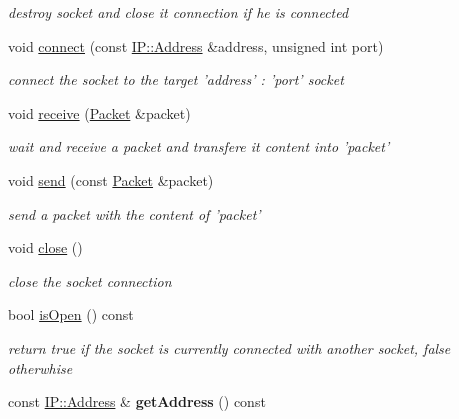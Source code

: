 \begin{DoxyCompactItemize}
\begin{DoxyCompactList}\small\item\em destroy socket and close it connection if he is connected \end{DoxyCompactList}\item 
void \hyperlink{class_f_t_p_1_1_t_c_p_1_1_socket_a220e0105754cdf9378411b24809a4f04}{connect} (const \hyperlink{class_f_t_p_1_1_i_p_1_1_address}{I\-P\-::\-Address} \&address, unsigned int port)
\begin{DoxyCompactList}\small\item\em connect the socket to the target 'address' \-: 'port' socket \end{DoxyCompactList}\item 
void \hyperlink{class_f_t_p_1_1_t_c_p_1_1_socket_a1a06bb837f2a2d82f3477ecf4da373c7}{receive} (\hyperlink{class_f_t_p_1_1_packet}{Packet} \&packet)
\begin{DoxyCompactList}\small\item\em wait and receive a packet and transfere it content into 'packet' \end{DoxyCompactList}\item 
void \hyperlink{class_f_t_p_1_1_t_c_p_1_1_socket_a7ebcedc1c8baba1a838bdb46babea2eb}{send} (const \hyperlink{class_f_t_p_1_1_packet}{Packet} \&packet)
\begin{DoxyCompactList}\small\item\em send a packet with the content of 'packet' \end{DoxyCompactList}\item 
\hypertarget{class_f_t_p_1_1_t_c_p_1_1_socket_a783815d519b4f76ac7f25e946e8be21e}{void \hyperlink{class_f_t_p_1_1_t_c_p_1_1_socket_a783815d519b4f76ac7f25e946e8be21e}{close} ()}\label{class_f_t_p_1_1_t_c_p_1_1_socket_a783815d519b4f76ac7f25e946e8be21e}

\begin{DoxyCompactList}\small\item\em close the socket connection \end{DoxyCompactList}\item 
\hypertarget{class_f_t_p_1_1_t_c_p_1_1_socket_a9323b1947771c55468a303199742a840}{bool \hyperlink{class_f_t_p_1_1_t_c_p_1_1_socket_a9323b1947771c55468a303199742a840}{is\-Open} () const }\label{class_f_t_p_1_1_t_c_p_1_1_socket_a9323b1947771c55468a303199742a840}

\begin{DoxyCompactList}\small\item\em return true if the socket is currently connected with another socket, false otherwhise \end{DoxyCompactList}\item 
\hypertarget{class_f_t_p_1_1_t_c_p_1_1_socket_a79f3892a2088f566286baf5e4e89f939}{const \hyperlink{class_f_t_p_1_1_i_p_1_1_address}{I\-P\-::\-Address} \& {\bfseries get\-Address} () const }\label{class_f_t_p_1_1_t_c_p_1_1_socket_a79f3892a2088f566286baf5e4e89f939}

\end{DoxyCompactItemize}
